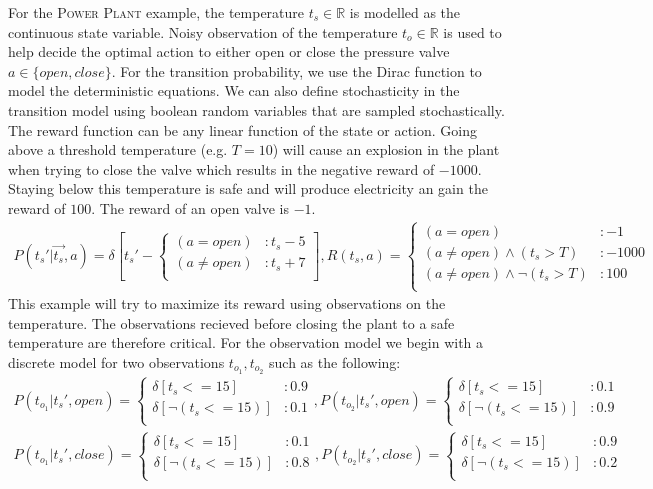 \documentclass{article} %
\begin{document}
For the \textsc{Power Plant} example, the temperature $t_s \in \mathbb{R}$ is modelled as the continuous state variable. Noisy observation of the temperature $t_o \in \mathbb{R}$ is used to help decide the optimal action to either open or close the pressure valve $a \in \{open,close\}$. 
For the transition probability, we use the Dirac function to model the deterministic equations. We can also define stochasticity in the transition model using boolean random variables that are sampled stochastically.  The reward function can be any linear function of the state or action. Going above a threshold temperature (e.g. $T=10$) will cause an explosion in the plant when trying to close the valve which results in the negative reward of $-1000$. Staying below this temperature is safe and will produce electricity an gain the reward of $100$. The reward of an open valve is $-1$.
\begin{align}
P(t_s'|\vec{t_s},a)= \delta\left[ t_s' - 
\begin{cases}
 (a=open) &: t_s - 5 \\ 
(a \neq open) &: t_s + 7 \\
\end{cases}
\right]\nonumber
, 
R(t_s,a) = 
\begin{cases}
 (a=open) &: -1 \\
(a \neq open)\wedge (t_s>T) &: -1000 \\
(a \neq open)\wedge \neg(t_s>T) &: 100 \\
\end{cases}\nonumber
\end{align}
This example will try to maximize its reward using observations on the temperature. The observations recieved before closing the plant to a safe temperature are therefore critical.  For the observation model we begin with a discrete model for two observations $t_{o_1},t_{o_2}$ such as the following:  
\begin{align}
P(t_{o_1}|t_s',open) = 
\begin{cases}
 \delta\left[ t_s <= 15 \right] &: 0.9 \\
 \delta\left[ \neg (t_s <= 15)\right] &: 0.1 \\
\end{cases}\nonumber
, 
P(t_{o_2}|t_s',open) = 
\begin{cases}
 \delta\left[ t_s <= 15 \right] &: 0.1 \\
 \delta\left[ \neg (t_s <= 15)\right] &: 0.9 \\
\end{cases}\nonumber
\\
P(t_{o_1}|t_s',close) = 
\begin{cases}
 \delta\left[ t_s <= 15 \right] &: 0.1 \\
 \delta\left[ \neg (t_s <= 15)\right] &: 0.8 \\
\end{cases}\nonumber
,
P(t_{o_2}|t_s',close) = 
\begin{cases}
 \delta\left[ t_s <= 15 \right] &: 0.9 \\
 \delta\left[ \neg (t_s <= 15)\right] &: 0.2 \\
\end{cases} \nonumber
\end{align}
\end{document}
